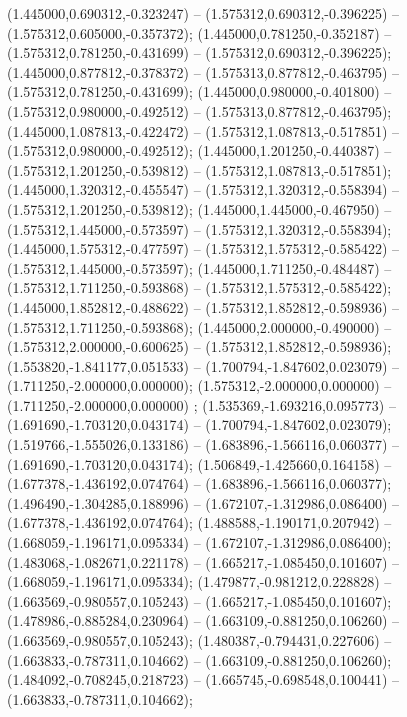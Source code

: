  (1.445000,0.690312,-0.323247) -- (1.575312,0.690312,-0.396225) -- (1.575312,0.605000,-0.357372);
 (1.445000,0.781250,-0.352187) -- (1.575312,0.781250,-0.431699) -- (1.575312,0.690312,-0.396225);
 (1.445000,0.877812,-0.378372) -- (1.575313,0.877812,-0.463795) -- (1.575312,0.781250,-0.431699);
 (1.445000,0.980000,-0.401800) -- (1.575312,0.980000,-0.492512) -- (1.575313,0.877812,-0.463795);
 (1.445000,1.087813,-0.422472) -- (1.575312,1.087813,-0.517851) -- (1.575312,0.980000,-0.492512);
 (1.445000,1.201250,-0.440387) -- (1.575312,1.201250,-0.539812) -- (1.575312,1.087813,-0.517851);
 (1.445000,1.320312,-0.455547) -- (1.575312,1.320312,-0.558394) -- (1.575312,1.201250,-0.539812);
 (1.445000,1.445000,-0.467950) -- (1.575312,1.445000,-0.573597) -- (1.575312,1.320312,-0.558394);
 (1.445000,1.575312,-0.477597) -- (1.575312,1.575312,-0.585422) -- (1.575312,1.445000,-0.573597);
 (1.445000,1.711250,-0.484487) -- (1.575312,1.711250,-0.593868) -- (1.575312,1.575312,-0.585422);
 (1.445000,1.852812,-0.488622) -- (1.575312,1.852812,-0.598936) -- (1.575312,1.711250,-0.593868);
 (1.445000,2.000000,-0.490000) -- (1.575312,2.000000,-0.600625) -- (1.575312,1.852812,-0.598936);
 (1.553820,-1.841177,0.051533) -- (1.700794,-1.847602,0.023079) -- (1.711250,-2.000000,0.000000);
 (1.575312,-2.000000,0.000000) -- (1.711250,-2.000000,0.000000) ;
 (1.535369,-1.693216,0.095773) -- (1.691690,-1.703120,0.043174) -- (1.700794,-1.847602,0.023079);
 (1.519766,-1.555026,0.133186) -- (1.683896,-1.566116,0.060377) -- (1.691690,-1.703120,0.043174);
 (1.506849,-1.425660,0.164158) -- (1.677378,-1.436192,0.074764) -- (1.683896,-1.566116,0.060377);
 (1.496490,-1.304285,0.188996) -- (1.672107,-1.312986,0.086400) -- (1.677378,-1.436192,0.074764);
 (1.488588,-1.190171,0.207942) -- (1.668059,-1.196171,0.095334) -- (1.672107,-1.312986,0.086400);
 (1.483068,-1.082671,0.221178) -- (1.665217,-1.085450,0.101607) -- (1.668059,-1.196171,0.095334);
 (1.479877,-0.981212,0.228828) -- (1.663569,-0.980557,0.105243) -- (1.665217,-1.085450,0.101607);
 (1.478986,-0.885284,0.230964) -- (1.663109,-0.881250,0.106260) -- (1.663569,-0.980557,0.105243);
 (1.480387,-0.794431,0.227606) -- (1.663833,-0.787311,0.104662) -- (1.663109,-0.881250,0.106260);
 (1.484092,-0.708245,0.218723) -- (1.665745,-0.698548,0.100441) -- (1.663833,-0.787311,0.104662);
